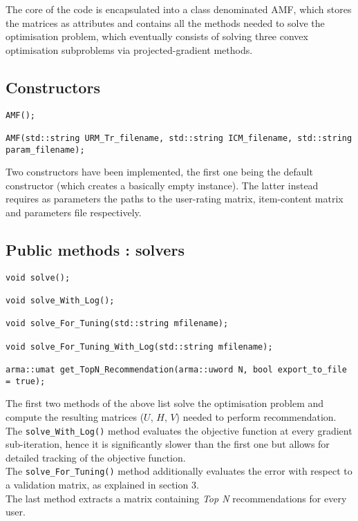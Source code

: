 \documentclass[paper=a4, fontsize=12pt]{scrartcl} %
\numberwithin{equation}{section} %
\numberwithin{figure}{section} %
\numberwithin{table}{section} %
\begin{document}
The core of the code is encapsulated into a class denominated AMF, which stores the matrices as attributes and contains all the methods needed to solve the optimisation problem, which eventually consists of solving three convex optimisation subproblems via projected-gradient methods.

\subsection{Constructors}
\begin{lstlisting}
AMF();

AMF(std::string URM_Tr_filename, std::string ICM_filename, std::string param_filename);
\end{lstlisting}
\vspace{0.5 cm}
Two constructors have been implemented, the first one being the default constructor (which creates a basically empty instance). The latter instead requires as parameters the paths to the user-rating matrix, item-content matrix and parameters file respectively.

\subsection{Public methods : solvers}
\begin{lstlisting}
void solve();
    
void solve_With_Log();

void solve_For_Tuning(std::string mfilename);

void solve_For_Tuning_With_Log(std::string mfilename);

arma::umat get_TopN_Recommendation(arma::uword N, bool export_to_file = true);

\end{lstlisting}
\vspace{0.5 cm}
The first two methods of the above list solve the optimisation problem and compute the resulting matrices ($U$, $H$, $V$) needed to perform recommendation. The \texttt{solve\_With\_Log()} method evaluates the objective function at every gradient sub-iteration, hence it is significantly slower than the first one but allows for detailed tracking of the objective function. \\

The \texttt{solve\_For\_Tuning()} method additionally evaluates the error with respect to a validation matrix, as explained in section 3. \\

The last method extracts a matrix containing \emph{Top N} recommendations for every user.
\end{document}
